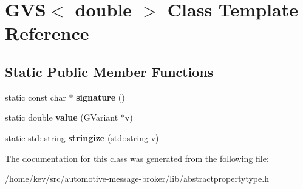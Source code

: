 \hypertarget{classGVS_3_01double_01_4}{\section{G\-V\-S$<$ double $>$ Class Template Reference}
\label{classGVS_3_01double_01_4}
}
\subsection*{Static Public Member Functions}
\begin{DoxyCompactItemize}
\item 
\hypertarget{classGVS_3_01double_01_4_a995d18f59b8a60af292ecb4778378f6a}{static const char $\ast$ {\bfseries signature} ()}\label{classGVS_3_01double_01_4_a995d18f59b8a60af292ecb4778378f6a}

\item 
\hypertarget{classGVS_3_01double_01_4_ab60f061e68f1e60367f62057a0549160}{static double {\bfseries value} (G\-Variant $\ast$v)}\label{classGVS_3_01double_01_4_ab60f061e68f1e60367f62057a0549160}

\item 
\hypertarget{classGVS_3_01double_01_4_aee0d8fdc467f97da7b072b1caa34b694}{static std\-::string {\bfseries stringize} (std\-::string v)}\label{classGVS_3_01double_01_4_aee0d8fdc467f97da7b072b1caa34b694}

\end{DoxyCompactItemize}


The documentation for this class was generated from the following file\-:\begin{DoxyCompactItemize}
\item 
/home/kev/src/automotive-\/message-\/broker/lib/abstractpropertytype.\-h\end{DoxyCompactItemize}
